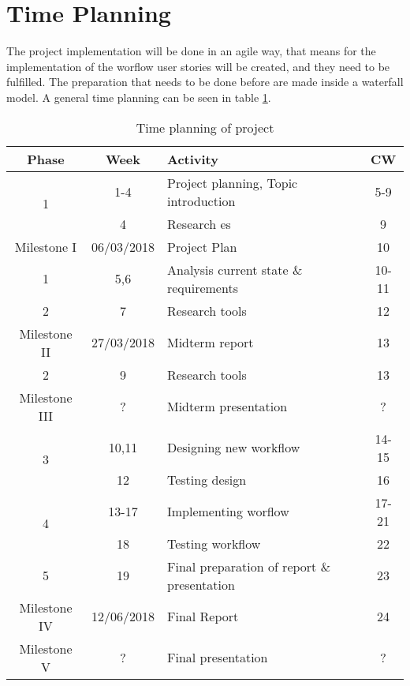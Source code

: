 \section{Time Planning}
The project implementation will be done in an agile way, that means for the implementation of the worflow user stories will be created, and they need to be fulfilled. The preparation that needs to be done before are made inside a waterfall model. A general time planning can be seen in table \ref{tab:timeplanning}. 
\begin{table} [h]
	\centering
	\begin{tabular}{|c|c|l|c|} \hline
		\rowcolor{Gray}Phase & Week & Activity & CW \\ \hline
		\multirow{2}{*}{1} & 1-4 & Project planning, Topic introduction & 5-9 \\
		& 4 & Research \gls{es} & 9 \\	\hline	
		Milestone I & 06/03/2018 & Project Plan & 10\\ \hline
		1 & 5,6 & Analysis current state \& requirements & 10-11  \\ \hline
		2 & 7 & Research tools & 12 \\ \hline
		Milestone II & 27/03/2018 & Midterm report & 13\\ \hline
		2 & 9 & Research tools & 13 \\ \hline
		Milestone III & ? & Midterm presentation & ? \\ \hline
		\multirow{2}{*}{3} & 10,11 & Designing new workflow & 14-15 \\
		& 12 & Testing design & 16 \\ \hline
		\multirow{2}{*}{4} & 13-17 & Implementing worflow & 17-21 \\
		& 18 & Testing workflow & 22 \\ \hline
		5 & 19 & Final preparation of report \& presentation & 23 \\ \hline
		Milestone IV & 12/06/2018 & Final Report & 24\\ \hline
		Milestone V & ? & Final presentation & ? \\ \hline
	\end{tabular}
	\caption{Time planning of project}
	\label{tab:timeplanning}
\end{table}

